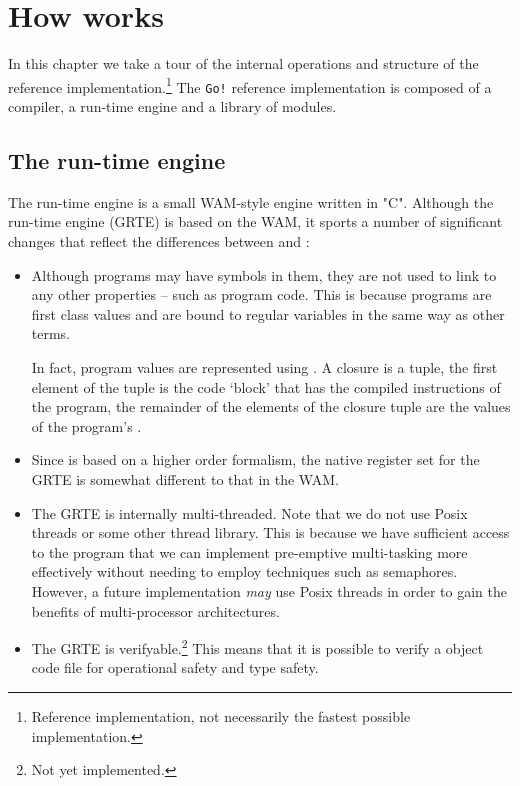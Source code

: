 \chapter{How \go works}
\label{howitworks}
\newcommand{\goir}{\mbox{\tt Go!} reference implementation\xspace}

In this chapter we take a tour of the internal operations and structure of the reference \go implementation.\footnote{Reference implementation, not necessarily the fastest possible implementation.} The \goir is composed of a compiler, a run-time engine and a library of \go modules.

\section{The \go run-time engine}
\label{howitworks:run-time}

The run-time engine is a small WAM-style engine \cite{warD:83} written in "C". Although the \go run-time engine (GRTE) is based on the WAM, it sports a number of significant changes that reflect the differences between \prolog and \go:
\begin{itemize}
\item
Although \go programs may have symbols in them, they are not used to link to any other properties -- such as program code. This is because \go programs are first class values and are bound to regular variables in the same way as other terms.

In fact, program values are represented using . A closure is a tuple, the first element of the tuple is the code `block' that has the compiled instructions of the program, the remainder of the elements of the closure tuple are the values of the program's .
\item
Since \go is based on a higher order formalism, the native register set for the GRTE is somewhat different to that in the WAM.
\item
The GRTE is internally multi-threaded. Note that we do not use Posix threads or some other thread library. This is because we have sufficient access to the \go program that we can implement pre-emptive multi-tasking more effectively without needing to employ techniques such as semaphores. However, a future implementation \emph{may} use Posix threads in order to gain the benefits of multi-processor architectures.
\item
The GRTE is verifyable.\footnote{Not yet implemented.} This means that it is possible to verify a \go object code file for operational safety and type safety.
\end{itemize}

